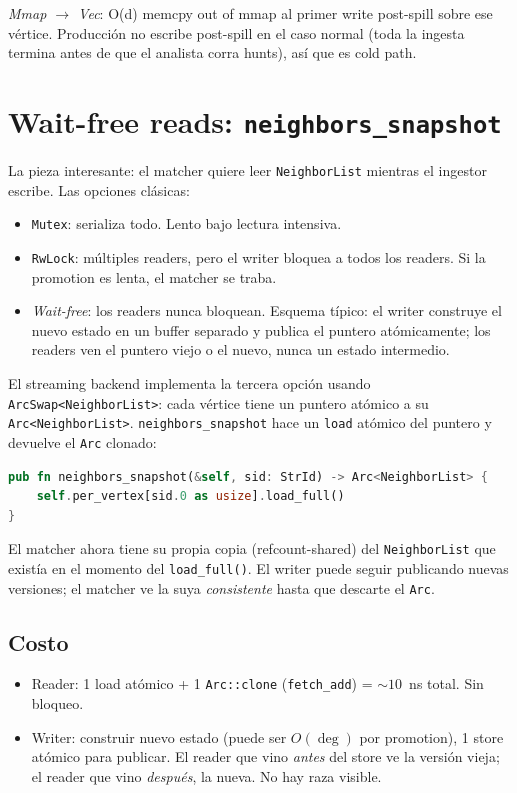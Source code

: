 \emph{Mmap \(\to\) Vec}: O(d) memcpy out of mmap al primer write
post-spill sobre ese vértice. Producción no escribe post-spill
en el caso normal (toda la ingesta termina antes de que el
analista corra hunts), así que es cold path.

\section{Wait-free reads: \texttt{neighbors\_snapshot}}

La pieza interesante: el matcher quiere leer
\texttt{NeighborList} mientras el ingestor escribe. Las opciones
clásicas:

\begin{itemize}
    \item \texttt{Mutex}: serializa todo. Lento bajo lectura
    intensiva.
    \item \texttt{RwLock}: múltiples readers, pero el writer
    bloquea a todos los readers. Si la promotion es lenta, el
    matcher se traba.
    \item \emph{Wait-free}: los readers nunca bloquean. Esquema
    típico: el writer construye el nuevo estado en un buffer
    separado y publica el puntero atómicamente; los readers ven el
    puntero viejo o el nuevo, nunca un estado intermedio.
\end{itemize}

\noindent
El streaming backend implementa la tercera opción usando
\texttt{ArcSwap<NeighborList>}: cada vértice tiene un puntero
atómico a su \texttt{Arc<NeighborList>}. \texttt{neighbors\_snapshot}
hace un \texttt{load} atómico del puntero y devuelve el
\texttt{Arc} clonado:

\begin{lstlisting}[language=Rust]
pub fn neighbors_snapshot(&self, sid: StrId) -> Arc<NeighborList> {
    self.per_vertex[sid.0 as usize].load_full()
}
\end{lstlisting}

\noindent
El matcher ahora tiene su propia copia (refcount-shared) del
\texttt{NeighborList} que existía en el momento del
\texttt{load\_full()}. El writer puede seguir publicando nuevas
versiones; el matcher ve la suya \emph{consistente} hasta que
descarte el \texttt{Arc}.

\subsection{Costo}

\begin{itemize}
    \item Reader: 1 load atómico + 1 \texttt{Arc::clone}
    (\texttt{fetch\_add}) = $\sim 10$~ns total. Sin bloqueo.
    \item Writer: construir nuevo estado (puede ser $O(\deg)$ por
    promotion), 1 store atómico para publicar. El reader que vino
    \emph{antes} del store ve la versión vieja; el reader que vino
    \emph{después}, la nueva. No hay raza visible.
\end{itemize}

